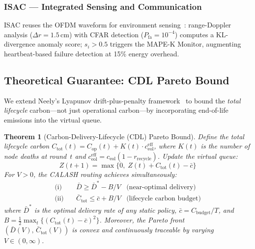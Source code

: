 \documentclass[12pt, onecolumn, journal]{IEEEtran}
\newtheorem{theorem}{Theorem}
\begin{document}
\subsubsection{ISAC --- Integrated Sensing and Communication}
\label{sec:isac}

ISAC reuses the OFDM waveform for environment sensing~\cite{liu2022isac, zhang2022isac_overview}: range-Doppler analysis ($\Delta r{=}1.5$\,cm) with CFAR detection ($P_{\text{fa}}{=}10^{-4}$) computes a KL-divergence anomaly score; $s_i > 0.5$ triggers the MAPE-K Monitor, augmenting heartbeat-based failure detection at 15\% energy overhead.

\subsection{Theoretical Guarantee: CDL Pareto Bound}
\label{sec:theorem}

We extend Neely's Lyapunov drift-plus-penalty framework~\cite{neely2010lyapunov} to bound the \emph{total lifecycle} carbon---not just operational carbon---by incorporating end-of-life emissions into the virtual queue.

\begin{theorem}[Carbon-Delivery-Lifecycle (CDL) Pareto Bound]
\label{thm:cdl}
Define the total lifecycle carbon $C_{\text{tot}}(t) = C_{\text{op}}(t) + K(t) \cdot c_{\text{eol}}^{\text{eff}}$, where $K(t)$ is the number of node deaths at round~$t$ and $c_{\text{eol}}^{\text{eff}} = c_{\text{eol}} (1 - r_{\text{recycle}})$.
Update the virtual queue:
\begin{equation}
    Z(t+1) = \max\big\{0,\; Z(t) + C_{\text{tot}}(t) - \bar{c}\big\}
    \label{eq:queue_update_cdl}
\end{equation}
For $V > 0$, the CALASH routing achieves simultaneously:
\begin{align}
    \text{(i)}  & \quad \bar{D} \geq \bar{D}^* - B/V  & \text{(near-optimal delivery)} \label{eq:delivery_bound} \\
    \text{(ii)} & \quad \bar{C}_{\text{tot}} \leq \bar{c} + B/V  & \text{(lifecycle carbon budget)} \label{eq:carbon_bound}
\end{align}
where $\bar{D}^*$ is the optimal delivery rate of any static policy, $\bar{c} = C_{\text{budget}}/T$, and $B = \frac{1}{2}\max_t\{(C_{\text{tot}}(t) - \bar{c})^2\}$.
Moreover, the Pareto front $(\bar{D}(V),\, \bar{C}_{\text{tot}}(V))$ is convex and continuously traceable by varying $V \in (0, \infty)$.
\end{theorem}
\end{document}
